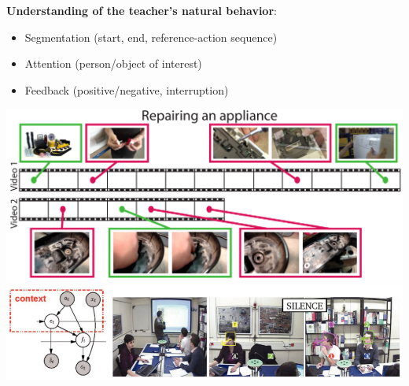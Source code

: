 \documentclass{beamer}
\begin{document}
\begin{frame}
\textbf{Understanding of the teacher's natural behavior}:
\begin{itemize}
\item Segmentation (start, end, reference-action sequence)
\item Attention (person/object of interest)
\item Feedback (positive/negative, interruption)
\end{itemize}
\begin{center}
\includegraphics[scale=0.2]{Pictures/ActionSegmentation.png} \\
\includegraphics[scale=0.25]{Pictures/SceneRepresentation.png}
\end{center}
\end{frame}
\end{document}
